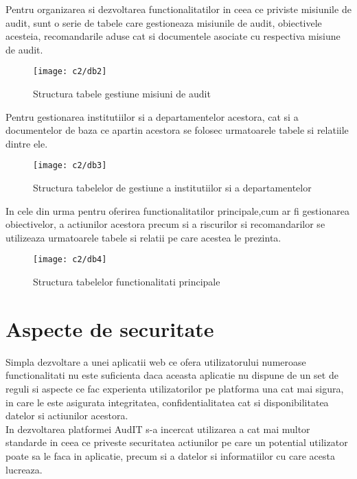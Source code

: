 Pentru organizarea si dezvoltarea functionalitatilor in ceea ce priviste misiunile de audit, sunt o serie de tabele care gestioneaza misiunile de audit, obiectivele acesteia, recomandarile aduse cat si documentele asociate cu respectiva misiune de audit.

\vspace{1cm}
\begin{figure}[h]
	\centering
	
	\texttt{[image: c2/db2]}
	\caption{Structura tabele gestiune misiuni de audit}
\end{figure}

\newpage
Pentru gestionarea institutiilor si a departamentelor acestora, cat si a documentelor de baza ce apartin acestora se folosec urmatoarele tabele si relatiile dintre ele.
\vspace{1cm}
\begin{figure}[h]
	\centering
	
	\texttt{[image: c2/db3]}
	\caption{Structura tabelelor de gestiune a institutiilor si a departamentelor}
\end{figure}

In cele din urma pentru oferirea functionalitatilor principale,cum ar fi gestionarea obiectivelor, a actiunilor acestora precum si a riscurilor si recomandarilor se utilizeaza urmatoarele tabele si relatii pe care acestea le prezinta.

\vspace{1cm}
\begin{figure}[h]
	\centering
	
	\texttt{[image: c2/db4]}
	\caption{Structura tabelelor functionalitati principale}
\end{figure}

\section{Aspecte de securitate}
Simpla dezvoltare a unei aplicatii web ce ofera utilizatorului numeroase functionalitati nu este suficienta daca aceasta aplicatie nu dispune de un set de reguli si aspecte ce  fac experienta utilizatorilor pe platforma una cat mai sigura, in care le este asigurata integritatea, confidentialitatea cat si disponibilitatea datelor si actiunilor acestora.\\
In dezvoltarea platformei AudIT s-a incercat utilizarea a cat mai multor standarde in ceea ce priveste securitatea actiunilor pe care un potential utilizator poate sa le faca in aplicatie, precum si a datelor si informatiilor cu care acesta lucreaza.

